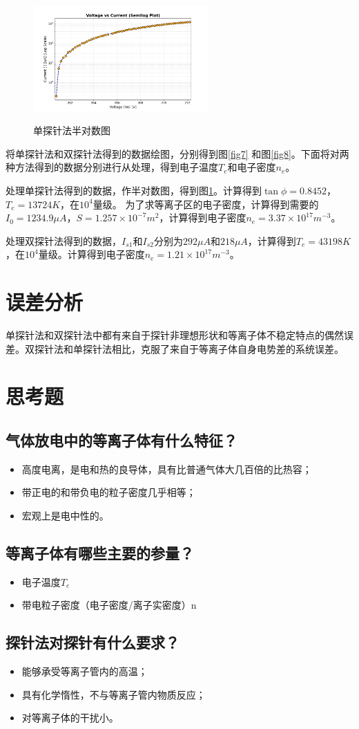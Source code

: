 \documentclass[a4paper]{article}
\begin{document}
\begin{figure}[!h]
\centering
\includegraphics[width=0.6\textwidth]{data/Figure_1_2.png}\\
\caption{单探针法半对数图}\label{fig9}
\end{figure}
将单探针法和双探针法得到的数据绘图，分别得到图\ref{fig7} 和图\ref{fig8}。下面将对两种方法得到的数据分别进行从处理，得到电子温度$T_{e}$和电子密度$n_{e}$。

处理单探针法得到的数据，作半对数图，得到图\ref{fig9}。计算得到$\tan\phi=0.8452$，$T_{e}=13724K$，在$10^{4}$量级。
为了求等离子区的电子密度，计算得到需要的$I_0=1234.9  \mu A$，$S=1.257\times 10^{-7}m^{2}$，计算得到电子密度$n_{e}=3.37\times 10^{17} m^{-3}$。

处理双探针法得到的数据，$I_{s1}$和$I_{s2}$分别为$292\mu A$和$218\mu A$，计算得到$T_{e}=43198K$，在$10^{4}$量级。计算得到电子密度$n_{e}=1.21\times 10^{17} m^{-3}$。
\section{误差分析}
单探针法和双探针法中都有来自于探针非理想形状和等离子体不稳定特点的偶然误差。双探针法和单探针法相比，克服了来自于等离子体自身电势差的系统误差。
\section{思考题}
\subsection{气体放电中的等离子体有什么特征？}
\begin{itemize}
    \item 高度电离，是电和热的良导体，具有比普通气体大几百倍的比热容；
    \item 带正电的和带负电的粒子密度几乎相等；
    \item 宏观上是电中性的。
\end{itemize}
\subsection{等离子体有哪些主要的参量？}
\begin{itemize}
    \item 电子温度$T_{e}$
    \item 带电粒子密度（电子密度/离子实密度）n
\end{itemize}
\subsection{探针法对探针有什么要求？}
\begin{itemize}
    \item 能够承受等离子管内的高温；
    \item 具有化学惰性，不与等离子管内物质反应；
    \item 对等离子体的干扰小。
\end{itemize}
\nocite{jiaocai}

\end{document}
